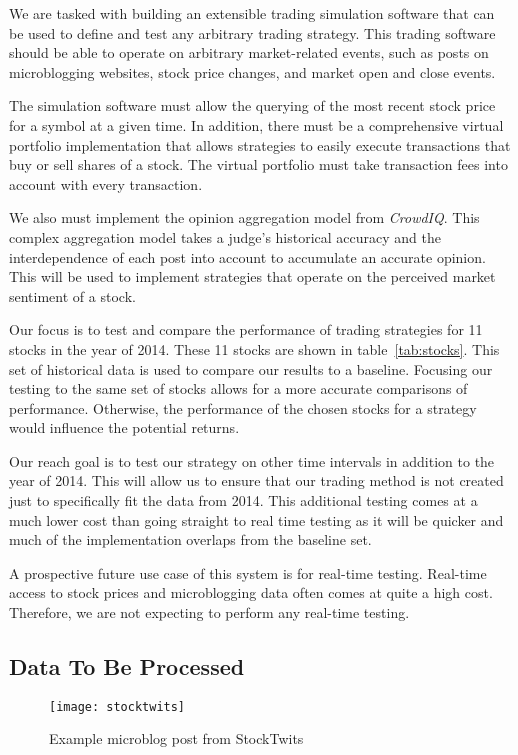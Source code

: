 We are tasked with building an extensible trading simulation software that can be used to define and test any arbitrary trading strategy.
This trading software should be able to operate on arbitrary market-related events, such as posts on microblogging websites, stock price changes, and market open and close events.

The simulation software must allow the querying of the most recent stock price for a symbol at a given time.
In addition, there must be a comprehensive virtual portfolio implementation that allows strategies to easily execute transactions that buy or sell shares of a stock.
The virtual portfolio must take transaction fees into account with every transaction.

We also must implement the opinion aggregation model from \textit{CrowdIQ}.
This complex aggregation model takes a judge's historical accuracy and the interdependence of each post into account to accumulate an accurate opinion.
This will be used to implement strategies that operate on the perceived market sentiment of a stock.

Our focus is to test and compare the performance of trading strategies for 11 stocks in the year of 2014.
These 11 stocks are shown in table~\ref{tab:stocks}.
This set of historical data is used to compare our results to a baseline.
Focusing our testing to the same set of stocks allows for a more accurate comparisons of performance.
Otherwise, the performance of the chosen stocks for a strategy would influence the potential returns.

Our reach goal is to test our strategy on other time intervals in addition to the year of 2014.
This will allow us to ensure that our trading method is not created just to specifically fit the data from 2014.
This additional testing comes at a much lower cost than going straight to real time testing as it will be quicker and much of the implementation overlaps from the baseline set. 

A prospective future use case of this system is for real-time testing.
Real-time access to stock prices and microblogging data often comes at quite a high cost.
Therefore, we are not expecting to perform any real-time testing.

\subsection{Data To Be Processed}

\begin{figure}
  \centering
  \texttt{[image: stocktwits]}
  \caption{Example microblog post from StockTwits}\label{fig:stocktwits}
\end{figure}

